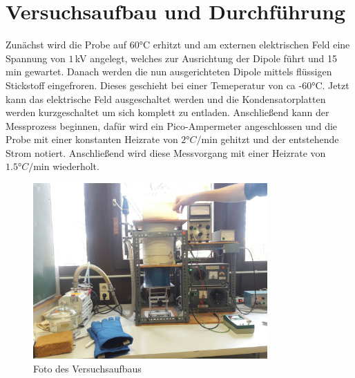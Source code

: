 \section{Versuchsaufbau und Durchführung}
\label{sec:Versuchaufbau}

Zunächst wird die Probe auf 60°C erhitzt und am externen elektrischen Feld
eine Spannung von $1\,$kV angelegt, welches zur Ausrichtung der Dipole
führt und 15 min gewartet. Danach werden die nun ausgerichteten Dipole
mittels flüssigen Stickstoff eingefroren. Dieses geschieht
bei einer Temeperatur von ca -60°C. Jetzt kann das elektrische Feld
ausgeschaltet werden und die Kondensatorplatten werden kurzgeschaltet um
sich komplett zu entladen. Anschließend kann der Messprozess beginnen,
dafür wird ein Pico-Ampermeter angeschlossen und die Probe mit einer
konstanten Heizrate von $2°C/$min gehitzt und der entstehende Strom notiert.
Anschließend wird diese Messvorgang mit einer Heizrate von $1.5°C/$min
wiederholt.
\begin{figure}
\centering
\includegraphics[width=0.8\textwidth]{ressources/photo5458414829602712357.jpg}
\caption{Foto des Versuchsaufbaus}
\label{aufbau}
\end{figure}
